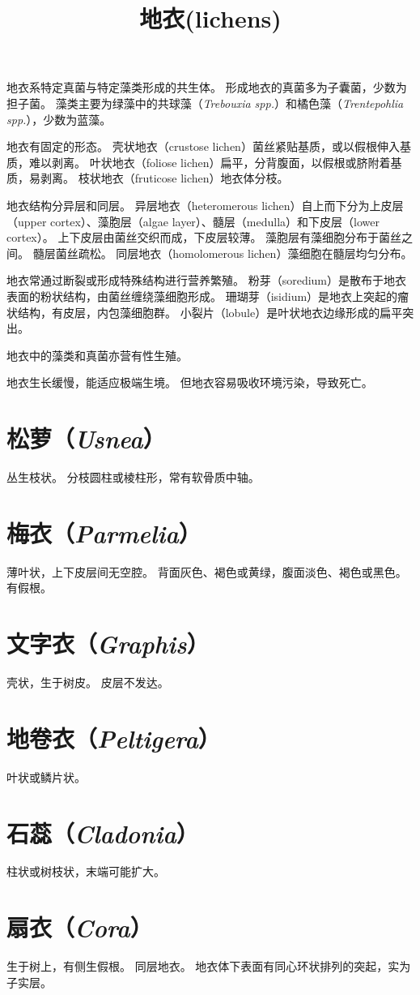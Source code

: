 \documentclass[11pt]{article}
\title{地衣(lichens)}
\date{}
\begin{document}
  \maketitle

  \linenumbers
地衣系特定真菌与特定藻类形成的共生体。
形成地衣的真菌多为子囊菌，少数为担子菌。
藻类主要为绿藻中的共球藻（\textit{Trebouxia spp.}）和橘色藻（\textit{Trentepohlia spp.}），少数为蓝藻。

\newline

地衣有固定的形态。
壳状地衣（crustose lichen）菌丝紧贴基质，或以假根伸入基质，难以剥离。
叶状地衣（foliose lichen）扁平，分背腹面，以假根或脐附着基质，易剥离。
枝状地衣（fruticose lichen）地衣体分枝。

\newline

地衣结构分异层和同层。
异层地衣（heteromerous lichen）自上而下分为上皮层（upper cortex）、藻胞层（algae layer）、髓层（medulla）和下皮层（lower cortex）。
上下皮层由菌丝交织而成，下皮层较薄。
藻胞层有藻细胞分布于菌丝之间。
髓层菌丝疏松。
同层地衣（homolomerous lichen）藻细胞在髓层均匀分布。

\newline

地衣常通过断裂或形成特殊结构进行营养繁殖。
粉芽（soredium）是散布于地衣表面的粉状结构，由菌丝缠绕藻细胞形成。
珊瑚芽（isidium）是地衣上突起的瘤状结构，有皮层，内包藻细胞群。
小裂片（lobule）是叶状地衣边缘形成的扁平突出。

\newline

地衣中的藻类和真菌亦营有性生殖。

\newline

地衣生长缓慢，能适应极端生境。
但地衣容易吸收环境污染，导致死亡。

\section{松萝（\textit{Usnea}）}
丛生枝状。
分枝圆柱或棱柱形，常有软骨质中轴。

\section{梅衣（\textit{Parmelia}）}
薄叶状，上下皮层间无空腔。
背面灰色、褐色或黄绿，腹面淡色、褐色或黑色。
有假根。

\section{文字衣（\textit{Graphis}）}
壳状，生于树皮。
皮层不发达。

\section{地卷衣（\textit{Peltigera}）}
叶状或鳞片状。

\section{石蕊（\textit{Cladonia}）}
柱状或树枝状，末端可能扩大。

\section{扇衣（\textit{Cora}）}
生于树上，有侧生假根。
同层地衣。
地衣体下表面有同心环状排列的突起，实为子实层。
\end{document}
